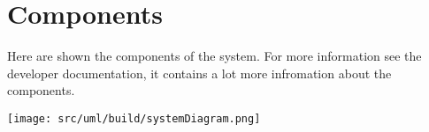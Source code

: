 \author{Tadd\"aus Nauheimer}

\chapter{Components}

Here are shown the components of the system.
For more information see the developer documentation, it contains a lot more infromation about the components.

\texttt{[image: src/uml/build/systemDiagram.png]}
